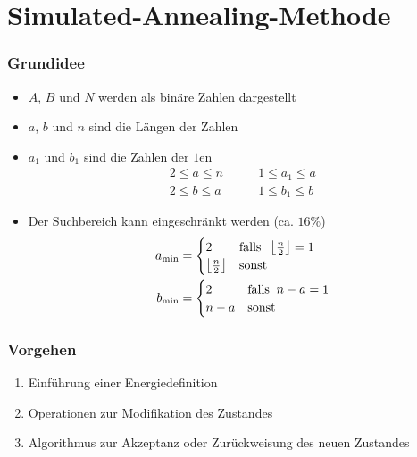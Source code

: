 \section{Simulated-Annealing-Methode}

\begin{frame}
  \frametitle{Grundidee}
  \begin{itemize}
    \item $A$, $B$ und $N$ werden als binäre Zahlen dargestellt
    \item $a$, $b$ und $n$ sind die Längen der Zahlen
    \pause
    \item $a_1$ und $b_1$ sind die Zahlen der $1$en
      \begin{align*}
        2 \leq a \leq n \quad&\quad 1 \leq a_1 \leq a \\
        2 \leq b \leq a \quad&\quad	1 \leq b_1 \leq b
      \end{align*}
    \pause
    \item Der Suchbereich kann eingeschränkt werden (ca. $16\%$)
      \begin{align*}
        a_{\mathrm{min}}&=\begin{cases} 2 & \mathrm{falls}\;\; \left\lfloor\frac{n}{2}\right\rfloor=1 \\ \left\lfloor\frac{n}{2}\right\rfloor & \mathrm{sonst} \end{cases} \\
        b_{\mathrm{min}}&=\begin{cases} 2 & \mathrm{falls}\;\; n-a=1 \\ n-a & \mathrm{sonst} \end{cases}
      \end{align*}
  \end{itemize}
\end{frame}

\begin{frame}
  \frametitle{Vorgehen}
  \begin{enumerate}
    \item Einführung einer Energiedefinition
    \pause{}
    \item Operationen zur Modifikation des Zustandes
    \pause{}
    \item Algorithmus zur Akzeptanz oder Zurückweisung des neuen Zustandes
  \end{enumerate}
\end{frame}

